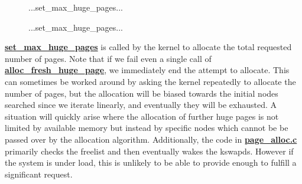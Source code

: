 \documentclass{article}
\begin{document}
\begin{figure}[h]
...set\_max\_huge\_pages...

\label{figure:Excerpt of Original set_max_huge_pages}
...set\_max\_huge\_pages...
\end{figure}

\href{http://lxr.free-electrons.com/source/mm/hugetlb.c?v=3.10#L1386}{\textbf{set\_max\_huge\_pages}} is called by the kernel to allocate the total requested number of pages. Note that if we fail even a single call of \href{http://lxr.free-electrons.com/source/mm/hugetlb.c?v=3.10#L758}{\textbf{alloc\_fresh\_huge\_page}}, we immediately end the attempt to allocate. This can sometimes be worked around by asking the kernel repeatedly to allocate the number of pages, but the allocation will be biased towards the initial nodes searched since we iterate linearly, and eventually they will be exhausted. A situation will quickly arise where the allocation of further huge pages is not limited by available memory but instead by specific nodes which cannot be be passed over by the allocation algorithm. Additionally, the code in \href{http://lxr.free-electrons.com/source/mm/page_alloc.c?v=3.10}{\textbf{page\_alloc.c}} primarily checks the freelist and then eventually wakes the kswapds. However if the system is under load, this is unlikely to be able to provide enough to fulfill a significant request.
\end{document}
